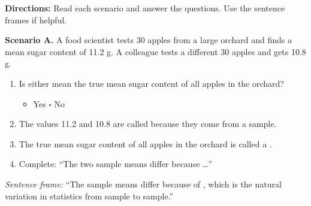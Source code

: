 \documentclass[10pt]{article}
\begin{document}
\namepartnerperiod

\vspace{0.15in}

\begin{tcolorbox}[colback=redbg, colframe=black!40, boxrule=0.6pt, arc=2mm,
    left=3mm, right=3mm, top=2mm, bottom=2mm, title=\textbf{Tier R --- Remediate}]
\textbf{Directions:} Read each scenario and answer the questions. Use the sentence
frames if helpful.

\textbf{Scenario A.} A food scientist tests 30 apples from a large orchard and finds
a mean sugar content of 11.2 g. A colleague tests a different 30 apples and gets 10.8 g.

\begin{enumerate}
  \item Is either mean the true mean sugar content of all apples in the orchard?
        \begin{itemize}
          \item[$\square$] Yes \quad $\square$ No
        \end{itemize}
  \item The values 11.2 and 10.8 are called \blank{3.5cm} because they come from a
        sample.
  \item The true mean sugar content of all apples in the orchard is called a
        \blank{3.5cm}.
  \item Complete: ``The two sample means differ because \ldots'' \writeline
\end{enumerate}

\vspace{0.06in}
\textit{Sentence frame:} ``The sample means differ because of \blank{4cm}, which is the
natural variation in statistics from sample to sample.''
\end{tcolorbox}

\vspace{0.1in}
\end{document}
